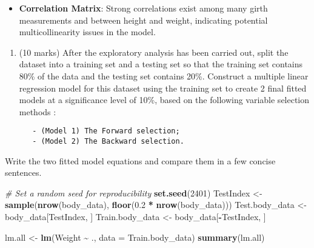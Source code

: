 \documentclass[
]{article}
\newenvironment{Shaded}{\begin{snugshade}}{\end{snugshade}}
\newcommand{\AttributeTok}[1]{\textcolor[rgb]{0.13,0.29,0.53}{#1}}
\newcommand{\CommentTok}[1]{\textcolor[rgb]{0.56,0.35,0.01}{\textit{#1}}}
\newcommand{\DecValTok}[1]{\textcolor[rgb]{0.00,0.00,0.81}{#1}}
\newcommand{\FloatTok}[1]{\textcolor[rgb]{0.00,0.00,0.81}{#1}}
\newcommand{\FunctionTok}[1]{\textcolor[rgb]{0.13,0.29,0.53}{\textbf{#1}}}
\newcommand{\NormalTok}[1]{#1}
\newcommand{\OtherTok}[1]{\textcolor[rgb]{0.56,0.35,0.01}{#1}}
\newcommand{\SpecialCharTok}[1]{\textcolor[rgb]{0.81,0.36,0.00}{\textbf{#1}}}
\providecommand{\tightlist}{%
  \setlength{\itemsep}{0pt}\setlength{\parskip}{0pt}}
\begin{document}
\begin{itemize}
\tightlist
\item
  \textbf{Correlation Matrix}: Strong correlations exist among many
  girth measurements and between height and weight, indicating potential
  multicollinearity issues in the model.
\end{itemize}

\begin{enumerate}
\def\labelenumi{(\alph{enumi})}
\setcounter{enumi}{1}
\item
  (10 marks) After the exploratory analysis has been carried out, split
  the dataset into a training set and a testing set so that the training
  set contains 80\% of the data and the testing set contains 20\%.
  Construct a multiple linear regression model for this dataset using
  the training set to create 2 final fitted models at a significance
  level of 10\%, based on the following variable selection methods :

\begin{verbatim}
   - (Model 1) The Forward selection; 
   - (Model 2) The Backward selection.
\end{verbatim}
\end{enumerate}

Write the two fitted model equations and compare them in a few concise
sentences.

\begin{Shaded}
\begin{Highlighting}[]
\CommentTok{\# Set a random seed for reproducibility}
\FunctionTok{set.seed}\NormalTok{(}\DecValTok{2401}\NormalTok{)}
\NormalTok{TestIndex }\OtherTok{\textless{}{-}} \FunctionTok{sample}\NormalTok{(}\FunctionTok{nrow}\NormalTok{(body\_data), }\FunctionTok{floor}\NormalTok{(}\FloatTok{0.2} \SpecialCharTok{*} \FunctionTok{nrow}\NormalTok{(body\_data)))}
\NormalTok{Test.body\_data }\OtherTok{\textless{}{-}}\NormalTok{ body\_data[TestIndex, ]}
\NormalTok{Train.body\_data }\OtherTok{\textless{}{-}}\NormalTok{ body\_data[}\SpecialCharTok{{-}}\NormalTok{TestIndex, ]}
\end{Highlighting}
\end{Shaded}

\begin{Shaded}
\begin{Highlighting}[]
\NormalTok{lm.all }\OtherTok{\textless{}{-}} \FunctionTok{lm}\NormalTok{(Weight }\SpecialCharTok{\textasciitilde{}}\NormalTok{ ., }\AttributeTok{data =}\NormalTok{ Train.body\_data)}
\FunctionTok{summary}\NormalTok{(lm.all)}
\end{Highlighting}
\end{Shaded}
\end{document}
